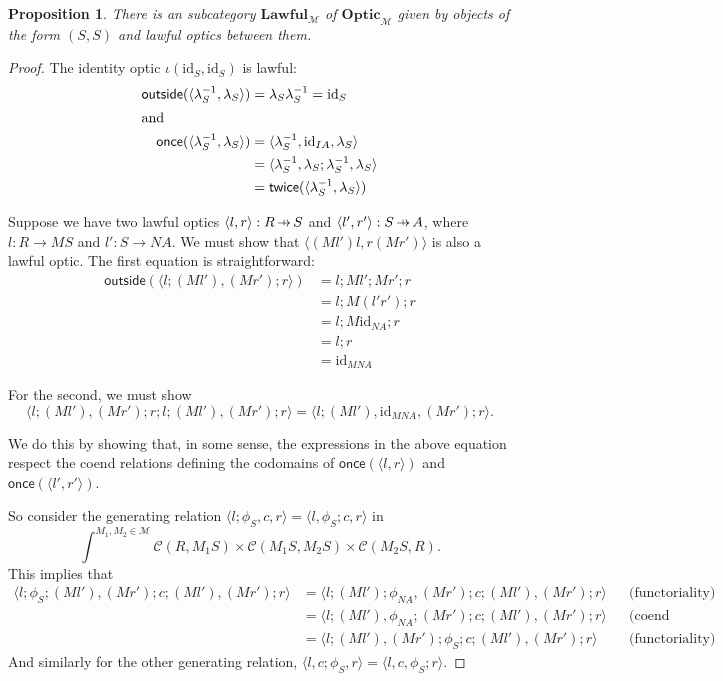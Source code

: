 \documentclass[11pt,a4paper]{article}
\theoremstyle{plain}
\newtheorem{proposition}[theorem]{Proposition}
\theoremstyle{definition}
\newcommand{\C}{\mathscr{C}}
\newcommand{\M}{\mathscr{M}}
\newcommand{\Optic}{\mathbf{Optic}}
\newcommand{\Lawful}{\mathbf{Lawful}}
\newcommand{\id}{\mathrm{id}}
\newcommand{\outside}{\mathsf{outside}}
\newcommand{\once}{\mathsf{once}}
\newcommand{\twice}{\mathsf{twice}}
\newcommand{\hto}{\ensuremath{\,\mathaccent\shortmid\rightarrow\,}}
\begin{document}
\begin{proposition}
There is an subcategory $\Lawful_\M$ of $\Optic_\M$ given by objects of the form $(S, S)$ and lawful optics between them.
\end{proposition}
\begin{proof}
The identity optic $\iota(\id_S, \id_S)$ is lawful: 
\begin{align*}
\outside(\langle \lambda^{-1}_S, \lambda_{S} \rangle) &= \lambda_{S} \lambda^{-1}_S = \id_S \\
\intertext{and}
\once(\langle \lambda^{-1}_S, \lambda_{S} \rangle) 
&= \langle \lambda^{-1}_S, \id_{IA}, \lambda_{S} \rangle \\
&= \langle \lambda^{-1}_S, \lambda_{S};\lambda^{-1}_S , \lambda_{S} \rangle \\
&= \twice(\langle \lambda^{-1}_S, \lambda_{S} \rangle)
\end{align*}

Suppose we have two lawful optics $\langle l, r \rangle : R \hto S$ and $\langle l', r' \rangle : S \hto A$, where $l : R \to MS$ and $l' : S \to NA$. We must show that $\langle (Ml')l, r (Mr')  \rangle$ is also a lawful optic. The first equation is straightforward:
\begin{align*}
\outside(\langle l; (Ml'),(Mr') ; r   \rangle) 
&= l ; Ml' ; Mr' ; r \\
&= l ; M(l'r') ; r \\
&= l ; M\id_{NA} ; r \\
&= l ; r \\
&= \id_{MNA}
\end{align*}

For the second, we must show
\[ \langle l;(Ml'), (Mr'); r;l;(Ml') , (Mr') ; r  \rangle = \langle l;(Ml'), \id_{MNA} , (Mr') ; r  \rangle. \]

We do this by showing that, in some sense, the expressions in the above equation respect the coend relations defining the codomains of $\once(\langle l, r \rangle)$ and $\once(\langle l', r' \rangle)$.

So consider the generating relation $\langle l;\phi_S, c, r \rangle = \langle l, \phi_S ; c, r \rangle$ in \[\int^{M_1, M_2 \in \M} \C(R, M_1 S) \times \C(M_1 S, M_2 S) \times \C(M_2 S, R).\]
This implies that 
\begin{align*}
\langle l;\phi_S;(Ml'), (Mr'); c ;(Ml') , (Mr') ; r \rangle 
&= \langle l;(Ml');\phi_{NA}, (Mr'); c ;(Ml') , (Mr') ; r \rangle && \text{(functoriality)} \\
&= \langle l;(Ml'), \phi_{NA};(Mr'); c ;(Ml') , (Mr') ; r \rangle && \text{(coend relation)} \\
&= \langle l;(Ml'), (Mr');\phi_{S}; c ;(Ml') , (Mr') ; r \rangle && \text{(functoriality)}
\end{align*}
And similarly for the other generating relation, $\langle l, c;\phi_S, r \rangle = \langle l,  c, \phi_S; r \rangle$.


\end{proof}
\end{document}
